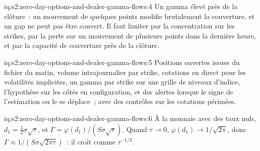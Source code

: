\begin{solution}{iq:s2:zero-day-options-and-dealer-gamma-flows:4}
Un gamma élevé près de la clôture~: un mouvement de quelques points modifie brutalement la couverture, et un gap ne peut pas être couvert. Il faut limiter par la concentration sur les strikes, par la perte
sur un mouvement de plusieurs points dans la dernière heure, et par la capacité de couverture près de la clôture.
\end{solution}

\begin{solution}{iq:s2:zero-day-options-and-dealer-gamma-flows:5}
Positions ouvertes issues du fichier du matin, volume intrajournalier par strike, cotations en direct pour les volatilités implicites, un gamma par strike sur une grille de niveaux d'indice, l'hypothèse sur les côtés
en configuration, et des alertes lorsque le signe de l'estimation ou le  se déplace~; avec des contrôles sur les cotations périmées.
\end{solution}

\begin{solution}{iq:s2:zero-day-options-and-dealer-gamma-flows:6}
À la monnaie avec des taux nuls, $d_1 = \tfrac12\sigma\sqrt\tau$, et $\Gamma = \varphi(d_1)/(S\sigma\sqrt\tau)$. Quand $\tau \to 0$, $\varphi(d_1) \to
1/\sqrt{2\pi}$, donc $\Gamma \approx 1/(S\sigma\sqrt{2\pi\tau})$~: il croît comme $\tau^{-1/2}$.
\end{solution}
